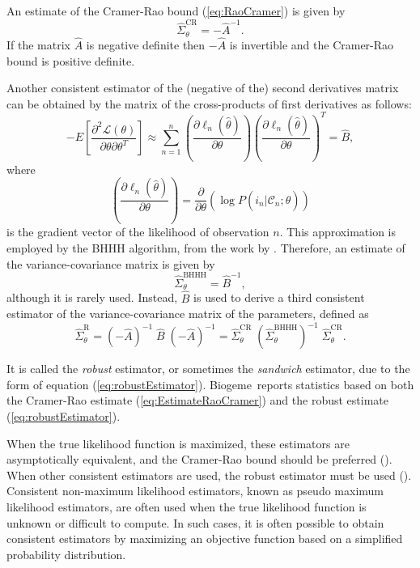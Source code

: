 \documentclass[12pt,a4paper]{article}
\newcommand{\req}[1]{(\ref{#1})}
\newcommand{\C}{\mathcal{C}}
\renewcommand{\L}{\mathcal{L}}
\newcommand{\BIOGEME}{Biogeme}
\begin{document}
 An estimate of the Cramer-Rao
bound \req{eq:RaoCramer} is given by 
\begin{equation}
\label{eq:EstimateRaoCramer}
\widehat{\Sigma}^{\text{CR}}_{\theta} = -\hat{A}^{-1}.
\end{equation}
If  the matrix $\hat{A}$ is  negative definite then $-\hat{A}$ is invertible and the Cramer-Rao bound is positive definite. 

Another consistent estimator of the (negative of the) second
derivatives matrix can be obtained by the matrix of the cross-products of first derivatives as follows:
\begin{equation}
\label{eq:binaryBHHH}
-E\left[ \frac{\partial^2 \L(\theta)}{\partial \theta \partial \theta^T}\right] \approx  \sum_{n=1}^n \left(\frac{\partial \ell_n(\hat{\theta})}{\partial \theta} \right)\left(\frac{\partial \ell_n(\hat{\theta})}{\partial \theta} \right)^T = \hat{B},
\end{equation}
 where
\begin{equation}
\left(\frac{\partial \ell_n(\hat{\theta})}{\partial \theta} \right) = \frac{\partial}{\partial \theta} (\log P(i_n|\C_n;\widehat{\theta}))
\end{equation}
is the gradient vector of the likelihood of observation $n$.
This approximation is employed by the BHHH algorithm, from the work by . Therefore, an estimate of the variance-covariance matrix 
is given by 
\begin{equation}
\widehat{\Sigma}^{\text{BHHH}}_{\theta} =\hat{B}^{-1},
\end{equation}
 although it is rarely used. 
Instead, $\hat{B}$ is
used to derive  a third consistent estimator of the variance-covariance matrix of
the parameters, defined as
\begin{equation}
\label{eq:robustEstimator}
\widehat{\Sigma}^{\text{R}}_{\theta} = (-\hat{A})^{-1} \; \widehat{B}\; (-\hat{A})^{-1} = \widehat{\Sigma}^{\text{CR}}_{\theta} \; (\widehat{\Sigma}^{\text{BHHH}}_{\theta})^{-1} \; \widehat{\Sigma}^{\text{CR}}_{\theta}.
\end{equation}

It is
called the \emph{robust} estimator, or sometimes the \emph{sandwich}
estimator, due to the form of equation
\req{eq:robustEstimator}. \BIOGEME\ reports statistics based on  both the Cramer-Rao estimate
\req{eq:EstimateRaoCramer} and the robust estimate \req{eq:robustEstimator}.


 When the true likelihood function is maximized,  these estimators are
 asymptotically equivalent, and the Cramer-Rao bound should be
preferred (\cite{KaueCarr2001}).  When other consistent estimators are
used, the robust estimator must be used
(\cite{Whit82}). Consistent non-maximum likelihood estimators, known
as pseudo maximum likelihood estimators, are often used when the true
likelihood function is unknown or difficult to compute. In such cases,
it is often possible to obtain consistent estimators by maximizing an
objective function based on a simplified probability distribution. 
\end{document}
